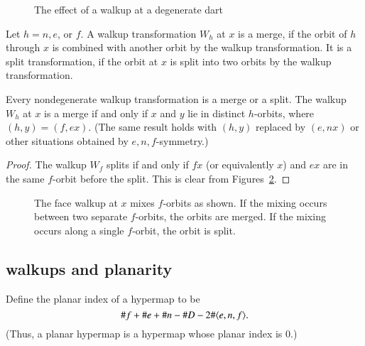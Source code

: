 \begin{figure}[htb]
  \centering
  \caption{The effect of a walkup at a degenerate dart}
  \label{fig:walkdeg}
\end{figure}


\begin{definition} Let $h=n,e$, or $f$.
A walkup transformation $W_h$ at $x$ is a merge,
if the orbit of $h$ through $x$ is combined with another orbit by
the walkup transformation.  It is a split transformation, if the
orbit at $x$ is split into two orbits by the walkup transformation.
\end{definition}

\begin{lemma}\label{lemma:merge-split} 
Every nondegenerate walkup transformation is a merge or a split.
The walkup $W_h$ at $x$ is a merge if and only if $x$ and $y$  lie
in distinct $h$-orbits, where $(h,y)=(f,e x)$.  
(The same result holds with $(h,y)$
replaced by $(e,n x)$ or other situations obtained by
$e,n,f$-symmetry.)
\end{lemma}

\begin{proof} The walkup $W_f$ splits if and only if $f x$ (or equivalently $x$)
and $e x$ are in the same $f$-orbit before the split. This is clear
from Figures~\ref{fig:split}.
\end{proof}


\begin{figure}[htb]
  \centering
  \caption{The face walkup at $x$ mixes $f$-orbits as shown.  If the mixing
   occurs between two separate $f$-orbits, the orbits are merged.  If the
   mixing occurs along a single $f$-orbit, the orbit is split.}
  \label{fig:split}
\end{figure}


\subsection{walkups and planarity}

\begin{definition} Define the planar index of a hypermap to be
$$\# f + \# e + \# n - \# D - 2\# \langle e,n,f\rangle.$$
(Thus, a planar hypermap is a hypermap whose planar index is $0$.)
\end{definition}

